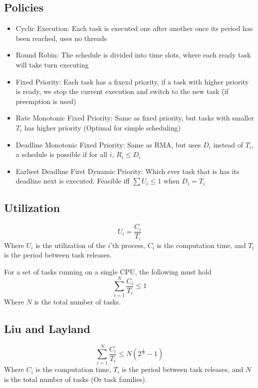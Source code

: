 \documentclass{article}
\begin{document}
		\subsection{Policies}
			\begin{itemize}
				\item Cyclic Execution: Each task is executed one after another once its period has been reached, uses no threads
				\item Round Robin: The schedule is divided into time slots, where each ready task will take turn executing
				\item Fixed Priority: Each task has a fixexd priority, if a task with higher priority is ready, we stop the current execution and switch to the new task (if preemption is used)
				\item Rate Monotonic Fixed Priority: Same as fixed priority, but tasks with smaller $T_i$ has higher priority (Optimal for simple scheduling)
				\item Deadline Monotonic Fixed Priority: Same as RMA, but uses $D_i$ instead of $T_i$, a schedule is possible if for all $i$, $R_i\leq D_i$
				\item Earliest Deadline First Dynamic Priority: Which ever task that is has its deadline next is executed. Feasible iff $\sum U_i\leq 1$ when $D_i=T_i$
			\end{itemize}

		\subsection{Utilization}
			\begin{equation}
				U_i=\frac{C_i}{T_i}
			\end{equation}
			Where $U_i$ is the utilization of the $i$'th process, $C_i$ is the computation time, and $T_i$ is the period between task releases.

			For a set of tasks running on a single CPU, the following must hold
			\begin{equation}
				\sum^N_{i=1}\frac{C_i}{T_i}\leq1
			\end{equation}
			Where $N$ is the total number of tasks.

		\subsection{Liu and Layland}
			\begin{equation}
				\sum^N_{i=1}\frac{C_i}{T_i}\leq N\left(2^{\frac{1}{N}}-1\right)
			\end{equation}
			Where $C_i$ is the computation time, $T_i$ is the period between task releases, and $N$ is the total number of tasks (Or task families).
\end{document}
